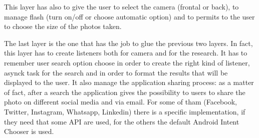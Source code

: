 This layer has also to give the user to select the camera (frontal or back), to 
manage flash (turn on/off or choose automatic option) and to permits to the user 
to choose the size of the photos taken.

The last layer is the one that has the job to glue the previous two layers. In 
fact, this layer has to create listeners both for camera and for the research. 
It has to remember user search option choose in order to create the right kind 
of listener, asynck task for the search and in order to format the results that 
will be displayed to the user. It also manage the application sharing process: 
as a matter of fact, after a search the application gives the possibility to 
users to share the photo on different social media and via email. For some of 
tham (Facebook, Twitter, Instagram, Whatsapp, Linkedin) there is a specific 
implementation, if they need that some API are used, for the others the default 
Android Intent Chooser is used. 